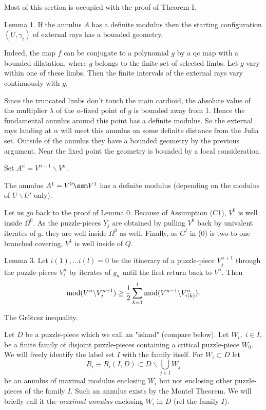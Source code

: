 Most of this section is occupied with the proof of Theorem I. 
     

\medskip{}

\proclaim Lemma 1. If the annulus $A$ has a definite modulus
 then the starting configuration
$(U,\gamma_i)$ of external rays has a bounded geometry.

 Indeed,  the map $f$ can be conjugate to a polynomial $g$
by a qc map with a bounded dilatation, where $g$ belongs to the finite set
of selected limbs. Let $g$ vary within one of these limbs. Then the 
finite intervals
of the external rays vary continuously with $g$. 

Since the truncated limbs don't touch the main cardioid, the absolute value of
the multiplier $\lambda$ of the $\alpha$-fixed point of $g$ is bounded
away from 1.
 Hence the fundamental annulus around this point
has a definite modulus. So the external rays landing at $\alpha$ will
meet this annulus on some definite distance from the Julia set.
Outside of the annulus they have a bounded geometry by
the previous argument. Near the fixed point the geometry is bounded
by a local consideration.         \QED 

Set $A^n=V^{n-1}\backslash V^n$.




 The annulus $A^1=V^0\ssm V^1$
has a definite modulus (depending on the modulus  of $U\backslash U'$
only).

 Let us go back to the proof of Lemma 0.
Because of Assumption (C1), $V^0$ is well inside $\Omega^0$. As the puzzle-pieces
 $Y_j$
are obtained by pulling $V^0$ back by univalent iterates of $g$.
they are well inside $\Omega^0$ as
well. Finally, as $G^l$ in (0) is two-to-one branched covering,
$V^1$ is well inside of $Q$. 
   \QED 

\medskip{} 
 

\proclaim Lemma 3. Let $i(1),...i(l)=0$ be the itinerary of a 
  puzzle-piece $V^{n+1}_j$ through the puzzle-pieces $V_i^n$ by 
   iterates of $g_n$
   until the first return back to $V^n$. Then
 $${\rm mod} (V^n\backslash V^{n+1}_j)\geq {1\over 2} 
     \sum_{k=1}^l{\rm mod} (V^{n-1}\backslash V^n_{i(k)}).$$

 The Gr\"{o}tcsz inequality.  \QED
 
 Let $D$ be a puzzle-piece which we call an "island" (compare below).
Let $W_i,\; i\in I$,  be a finite family of disjoint 
 puzzle-pieces  containing a critical puzzle-piece $W_0$.
We will freely identify the label set $I$ with the family itself.
For $W_i\subset D$ let 
$$R_i\equiv R_i(I, D)\subset D\backslash\bigcup _{j\in I}W_j$$ be
an annulus of maximal modulus enclosing $W_i$  but not enclosing other
puzzle-pieces of the family $I$. Such an annulus exists by the Montel
Theorem. We will briefly call it the {\sl maximal annulus} enclosing
$W_i$ in $D$ (rel the family $I$). 

